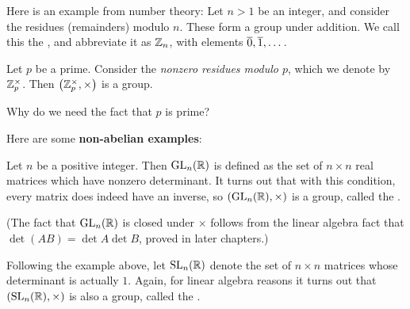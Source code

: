 \begin{example}
	Here is an example from number theory:
	Let $n > 1$ be an integer,
	and consider the residues (remainders) modulo $n$.
	These form a group under addition.
	We call this the ,
	and abbreviate it as $\mathbb Z_{n}$, with elements $\overline 0, \overline 1, \dots$.
	\label{def:cyclic_group}
\end{example}
\begin{example}
	Let $p$ be a prime.
	Consider the \emph{nonzero residues modulo $p$},
	which we denote by $\mathbb Z_{p}^\times$.
	Then $\left( \mathbb Z_{p}^\times, \times \right)$ is a group.
	\label{def:mult_mod_p}
\end{example}
\begin{ques}
	Why do we need the fact that $p$ is prime?
\end{ques}

Here are some \textbf{non-abelian examples}:
\begin{example}
	Let $n$ be a positive integer.
	Then $\operatorname{GL}_n(\mathbb R)$ is defined as the set of $n \times n$ real matrices
	which have nonzero determinant.
	It turns out that with this condition,
	every matrix does indeed have an inverse,
	so $(\operatorname{GL}_n(\mathbb R), \times)$ is a group, called the
	.

	(The fact that $\operatorname{GL}_n(\mathbb R)$ is closed under $\times$ follows
	from the linear algebra fact that $\det (AB) = \det A \det B$,
	proved in later chapters.)
\end{example}
\begin{example}
	Following the example above, let $\operatorname{SL}_n(\mathbb R)$ denote 
	the set of $n \times n$ matrices whose determinant is actually $1$.
	Again, for linear algebra reasons
	it turns out that $(\operatorname{SL}_n(\mathbb R), \times)$ is also a group,
	called the .
\end{example}

